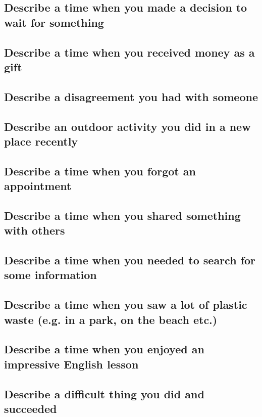\documentclass[conference]{IEEEtran}
\begin{document}
\subsection{Describe a time when you made a decision to wait for something}
\subsection{Describe a time when you received money as a gift}
\subsection{Describe a disagreement you had with someone}
\subsection{Describe an outdoor activity you did in a new place recently}
\subsection{Describe a time when you forgot an appointment}
\subsection{Describe a time when you shared something with others}
\subsection{Describe a time when you needed to search for some information}
\subsection{Describe a time when you saw a lot of plastic waste (e.g. in a park, on the beach
etc.)}
\subsection{Describe a time when you enjoyed an impressive English lesson}
\subsection{Describe a difficult thing you did and succeeded}
\end{document}

